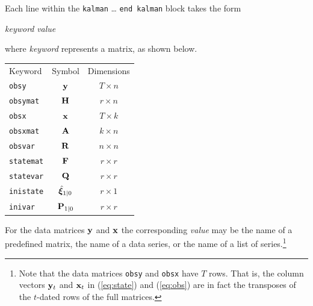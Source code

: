 \documentclass[a4paper]{article}
\newcommand{\obsvec}{\ensuremath\mathbf{y}}
\newcommand{\obsmat}{\ensuremath\mathbf{H}}
\newcommand{\obsx}{\ensuremath\mathbf{x}}
\newcommand{\obsxmat}{\ensuremath\mathbf{A}}
\newcommand{\obsvar}{\ensuremath\mathbf{R}}
\newcommand{\statevec}{\ensuremath\mathbf{\bm \xi}}
\newcommand{\statemat}{\ensuremath\mathbf{F}}
\newcommand{\strvar}{\ensuremath\mathbf{Q}}
\newcommand{\statevar}{\ensuremath\mathbf{P}}
\begin{document}
Each line within the \texttt{kalman} \dots{} \texttt{end kalman} block 
takes the form

\vspace{1ex}
\textsl{keyword} \textsl{value}
\vspace{1ex}

\noindent where \textsl{keyword} represents a matrix, as shown 
below.

\begin{center}
\begin{tabular}{lcc}
Keyword & Symbol & Dimensions \\[6pt]
\texttt{obsy}     & $\obsvec$         & $T \times n$ \\
\texttt{obsymat}  & $\obsmat$         & $r \times n$ \\
\texttt{obsx}     & $\obsx$           & $T \times k$ \\
\texttt{obsxmat}  & $\obsxmat$        & $k \times n$ \\ 
\texttt{obsvar}   & $\obsvar$         & $n \times n$ \\
\texttt{statemat} & $\statemat$       & $r \times r$ \\
\texttt{statevar} & $\strvar$         & $r \times r$ \\
\texttt{inistate} & $\hat{\statevec}_{1|0}$  & $r \times 1$ \\
\texttt{inivar}   & $\statevar_{1|0}$ & $r \times r$ \\
\end{tabular}
\end{center}

For the data matrices $\obsvec$ and $\obsx$ the corresponding
\textsl{value} may be the name of a predefined matrix, the name of a
data series, or the name of a list of series.\footnote{Note that the
  data matrices \texttt{obsy} and \texttt{obsx} have $T$ rows.  That
  is, the column vectors $\obsvec_t$ and $\obsx_t$ in (\ref{eq:state})
  and (\ref{eq:obs}) are in fact the transposes of the $t$-dated rows
  of the full matrices.}  
\end{document}
